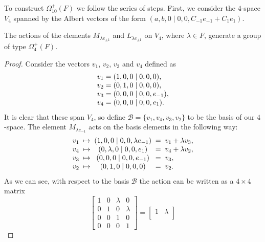 To construct $\Omega_{10}^+(F)$ we follow the series of steps. First, we consider the
$4$-space $V_4$ spanned by the Albert vectors of the form 
\mbox{$(a,b,0\mid 0,0,C_{-1}e_{-1} + C_1 e_1)$}. 

\begin{lemma}
	The actions of the elements $M_{\lambda e_{\pm 1}}$ and $L_{\lambda e_{\pm 1}}$
	on $V_4$, where $\lambda \in F$, generate a group of type $\Omega_4^+(F)$.
\end{lemma}

\begin{proof}
	Consider the vectors $v_1$, $v_2$, $v_3$ and $v_4$ defined as
	\begin{equation*}
		\begin{array}{r@{\;}c@{\;}l}
			v_1 & = & (1,0,0 \mid 0,0,0), \\
			v_2 & = & (0,1,0 \mid 0,0,0), \\
			v_3 & = & (0,0,0 \mid 0,0,e_{-1}), \\
			v_4 & = & (0,0,0 \mid 0,0,e_1).
		\end{array}
	\end{equation*}
	It is clear that these span $V_4$, so define $\mathcal{B} = \{v_1, v_4, v_3, v_2\}$
	to be the basis of our $4$-space. The element $M_{\lambda e_{-1}}$ acts on the 
	basis elements in the following way:
	\begin{equation*}
		\begin{array}{r@{\;\;}c@{\;\;}c@{\;\;}c@{\;\;}l}
			v_1 & \mapsto & (1,0,0 \mid 0,0,\lambda e_{-1}) & = & v_1 + \lambda v_3, \\
			v_4 & \mapsto & (0,\lambda,0 \mid 0,0,e_1) & = & v_4 + \lambda v_2, \\
			v_3 & \mapsto & (0,0,0 \mid 0,0,e_{-1}) & = & v_3, \\
			v_2 & \mapsto & (0,1,0 \mid 0,0,0) & = & v_2.
		\end{array}
	\end{equation*}
	As we can see, with respect to the basis $\mathcal{B}$ the action can be written
	as a $4\times 4$ matrix
	\begin{equation*}
		\begin{bmatrix}
			1 & 0 & \lambda & 0 \\
			0 & 1 & 0 & \lambda \\
			0 & 0 & 1 & 0 \\
			0 & 0 & 0 & 1
		\end{bmatrix} = 
		\begin{bmatrix}
			1 & \lambda \\

\end{bmatrix}
\end{equation*}
\end{proof}

